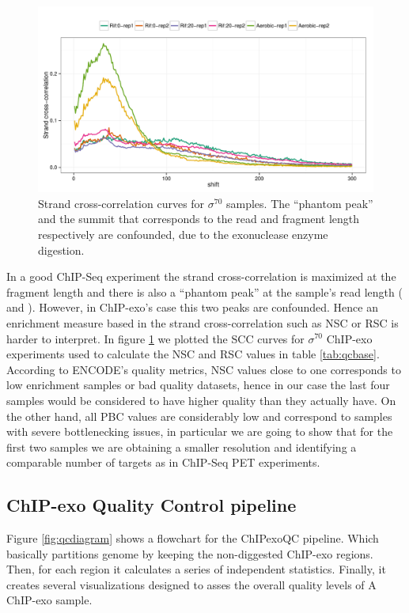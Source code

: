 \documentclass{bmcart}\usepackage[]{graphicx}\usepackage[]{color}
\begin{document}
\begin{figure}[h!]
  \centering
  \includegraphics[width = .8\textwidth]{../figs/for_paper/EColi_strand_cross_corr.pdf}
  \caption{Strand cross-correlation curves for $\sigma^{70}$
    samples. The ``phantom peak'' and the summit that corresponds to
    the read and fragment length respectively are confounded, due to
    the exonuclease enzyme digestion.}
  \label{figsup:scc}
\end{figure}

In a good ChIP-Seq experiment the strand cross-correlation is
maximized at the fragment length and there is also a ``phantom peak''
at the sample's read length (\cite{encode_qc} and \cite{strandcc}).
However, in ChIP-exo's case this two peaks are confounded. Hence an
enrichment measure based in the strand cross-correlation such as NSC
or RSC is harder to interpret. In figure \ref{figsup:scc} we plotted
the SCC curves for $\sigma^{70}$ ChIP-exo experiments used to
calculate the NSC and RSC values in table \ref{tab:qcbase}. According
to ENCODE's quality metrics, NSC values close to one corresponds to
low enrichment samples or bad quality datasets, hence in our case the
last four samples would be considered to have higher quality than they
actually have. On the other hand, all PBC values are considerably low
and correspond to samples with severe bottlenecking issues, in
particular we are going to show that for the first two samples we are
obtaining a smaller resolution and identifying a comparable number of
targets as in ChIP-Seq PET experiments.


\subsection{ChIP-exo Quality Control pipeline}
\label{sec:QC}

Figure \ref{fig:qcdiagram} shows a flowchart for the ChIPexoQC
pipeline. Which basically partitions genome by keeping the
non-diggested ChIP-exo regions. Then, for each region it calculates a
series of independent statistics. Finally, it creates several
visualizations designed to asses the overall quality levels of A
ChIP-exo sample.
\end{document}
